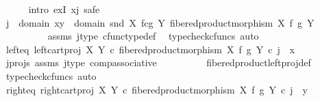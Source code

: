 \begin{isabellebody}
\ \ \ \ \isamarkupfalse%
\ {\isacharparenleft}{\kern0pt}intro\ exI{\isacharbrackleft}{\kern0pt}\ x{\isacharequal}{\kern0pt}j{\isacharbrackright}{\kern0pt}{\isacharcomma}{\kern0pt}\ safe{\isacharparenright}{\kern0pt}\isanewline
\ \ \ \ \ \ \isamarkupfalse%
\ {\isachardoublequoteopen}j\ {\isacharcolon}{\kern0pt}\ domain\ {\isasymlangle}x{\isacharcomma}{\kern0pt}y{\isasymrangle}\ {\isasymrightarrow}\ domain\ {\isacharparenleft}{\kern0pt}snd\ {\isacharparenleft}{\kern0pt}X\ \isactrlbsub f\isactrlesub {\isasymtimes}\isactrlsub c\isactrlbsub g\isactrlesub \ Y{\isacharcomma}{\kern0pt}\ fibered{\isacharunderscore}{\kern0pt}product{\isacharunderscore}{\kern0pt}morphism\ X\ f\ g\ Y{\isacharparenright}{\kern0pt}{\isacharparenright}{\kern0pt}{\isachardoublequoteclose}\isanewline
\ \ \ \ \ \ \ \ \isamarkupfalse%
\ assms\ j{\isacharunderscore}{\kern0pt}type\ cfunc{\isacharunderscore}{\kern0pt}type{\isacharunderscore}{\kern0pt}def\ \isamarkupfalse%
\ {\isacharparenleft}{\kern0pt}typecheck{\isacharunderscore}{\kern0pt}cfuncs{\isacharcomma}{\kern0pt}\ auto{\isacharparenright}{\kern0pt}\isanewline
\isanewline
\ \ \ \ \ \ \isamarkupfalse%
\ left{\isacharunderscore}{\kern0pt}eq{\isacharcolon}{\kern0pt}\ {\isachardoublequoteopen}left{\isacharunderscore}{\kern0pt}cart{\isacharunderscore}{\kern0pt}proj\ X\ Y\ {\isasymcirc}\isactrlsub c\ fibered{\isacharunderscore}{\kern0pt}product{\isacharunderscore}{\kern0pt}morphism\ X\ f\ g\ Y\ {\isasymcirc}\isactrlsub c\ j\ {\isacharequal}{\kern0pt}\ x{\isachardoublequoteclose}\isanewline
\ \ \ \ \ \ \ \ \isamarkupfalse%
\ j{\isacharunderscore}{\kern0pt}projs\ assms\ j{\isacharunderscore}{\kern0pt}type\ comp{\isacharunderscore}{\kern0pt}associative{}\isanewline
\ \ \ \ \ \ \ \ \isamarkupfalse%
\ fibered{\isacharunderscore}{\kern0pt}product{\isacharunderscore}{\kern0pt}left{\isacharunderscore}{\kern0pt}proj{\isacharunderscore}{\kern0pt}def\ \isamarkupfalse%
\ {\isacharparenleft}{\kern0pt}typecheck{\isacharunderscore}{\kern0pt}cfuncs{\isacharcomma}{\kern0pt}\ auto{\isacharparenright}{\kern0pt}\isanewline
\isanewline
\ \ \ \ \ \ \isamarkupfalse%
\ right{\isacharunderscore}{\kern0pt}eq{\isacharcolon}{\kern0pt}\ {\isachardoublequoteopen}right{\isacharunderscore}{\kern0pt}cart{\isacharunderscore}{\kern0pt}proj\ X\ Y\ {\isasymcirc}\isactrlsub c\ fibered{\isacharunderscore}{\kern0pt}product{\isacharunderscore}{\kern0pt}morphism\ X\ f\ g\ Y\ {\isasymcirc}\isactrlsub c\ j\ {\isacharequal}{\kern0pt}\ y{\isachardoublequoteclose}\isanewline

\end{isabellebody}
